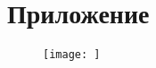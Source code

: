 \documentclass[../main/main.tex]{subfiles}
\begin{document}
    \newpage
    \section{Приложение}
    \begin{figure}[h]
        \texttt{[image: ]}
        \caption{}
    \end{figure}
\end{document}
